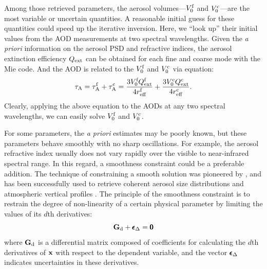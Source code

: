 Among those retrieved parameters, the aerosol volumes---$V_0^\text{f}$ and
$V_0^\text{c}$---are the most variable or uncertain quantities. A reasonable
initial guess for these quantities could speed up the iterative
inversion. Here, we “look up” their initial values from the AOD
measurements at two spectral wavelengths. Given the \textit{a priori}
 information on the aerosol PSD and refractive indices, the aerosol 
extinction efficiency $Q_\text{ext}$ can be obtained for each fine and coarse 
mode with the Mie code. And the AOD is related to the $V_0^\text{f}$ and
$V_0^\text{c}$ via equation:
\begin{equation}
\tau_\text{A} = \tau_\text{A}^\text{f} + \tau_\text{A}^\text{c} 
      = \frac{3V_0^\text{f}Q_\text{ext}^\text{f}}{4r_\text{eff}^\text{f}} +
        \frac{3V_0^\text{c}Q_\text{ext}^\text{c}}{4r_\text{eff}^\text{c}}. 
\end{equation}
Clearly, applying the above equation to the AODs at any two spectral
wavelengths, we can easily solve $V_0^\text{f}$ and $V_0^\text{c}$.

For some parameters, the \textit{a priori} estimates may be poorly known, 
but these parameters behave smoothly with no sharp oscillations. For
example, the aerosol refractive index usually does not vary rapidly over
the visible to near-infrared spectral range. In this regard, a
smoothness constraint could be a preferable addition. The technique of
constraining a smooth solution was pioneered by \citet{Phillips62,
Twomey63}, and has been successfully used to retrieve coherent
aerosol size distributions \citep{Dubovik00a} and atmospheric
vertical profiles \citep{Twomey77}. The principle of the smoothness
constraint is to restrain the degree of non-linearity of a certain
physical parameter by limiting the values of its $d$th derivatives:
\begin{equation}
\mathbf{G}_\text{d}+\pmb{\epsilon}_\Delta=\pmb{0} \label{eq:smooth}
\end{equation}
where $\mathbf{G}_\text{d}$ is a differential matrix composed of coefficients for
calculating the $d$th derivatives of $\mathbf{x}$ with respect to the dependent
variable, and the vector $\pmb{\epsilon}_\Delta$ indicates uncertainties in these
derivatives. 

